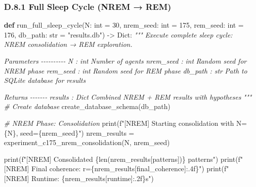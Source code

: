 \documentclass[
]{article}
\newenvironment{Shaded}{}{}
\newcommand{\BuiltInTok}[1]{\textcolor[rgb]{0.00,0.50,0.00}{#1}}
\newcommand{\CommentTok}[1]{\textcolor[rgb]{0.38,0.63,0.69}{\textit{#1}}}
\newcommand{\DecValTok}[1]{\textcolor[rgb]{0.25,0.63,0.44}{#1}}
\newcommand{\KeywordTok}[1]{\textcolor[rgb]{0.00,0.44,0.13}{\textbf{#1}}}
\newcommand{\NormalTok}[1]{#1}
\newcommand{\OperatorTok}[1]{\textcolor[rgb]{0.40,0.40,0.40}{#1}}
\newcommand{\SpecialCharTok}[1]{\textcolor[rgb]{0.25,0.44,0.63}{#1}}
\newcommand{\SpecialStringTok}[1]{\textcolor[rgb]{0.73,0.40,0.53}{#1}}
\newcommand{\StringTok}[1]{\textcolor[rgb]{0.25,0.44,0.63}{#1}}
\begin{document}
\subsubsection{D.8.1 Full Sleep Cycle (NREM →
REM)}\label{d.8.1-full-sleep-cycle-nrem-rem}

\begin{Shaded}
\begin{Highlighting}[]
\KeywordTok{def}\NormalTok{ run\_full\_sleep\_cycle(N: }\BuiltInTok{int} \OperatorTok{=} \DecValTok{30}\NormalTok{,}
\NormalTok{                        nrem\_seed: }\BuiltInTok{int} \OperatorTok{=} \DecValTok{175}\NormalTok{,}
\NormalTok{                        rem\_seed: }\BuiltInTok{int} \OperatorTok{=} \DecValTok{176}\NormalTok{,}
\NormalTok{                        db\_path: }\BuiltInTok{str} \OperatorTok{=} \StringTok{"results.db"}\NormalTok{) }\OperatorTok{{-}\textgreater{}}\NormalTok{ Dict:}
    \CommentTok{"""}
\CommentTok{    Execute complete sleep cycle: NREM consolidation → REM exploration.}

\CommentTok{    Parameters}
\CommentTok{    {-}{-}{-}{-}{-}{-}{-}{-}{-}{-}}
\CommentTok{    N : int}
\CommentTok{        Number of agents}
\CommentTok{    nrem\_seed : int}
\CommentTok{        Random seed for NREM phase}
\CommentTok{    rem\_seed : int}
\CommentTok{        Random seed for REM phase}
\CommentTok{    db\_path : str}
\CommentTok{        Path to SQLite database for results}

\CommentTok{    Returns}
\CommentTok{    {-}{-}{-}{-}{-}{-}{-}}
\CommentTok{    results : Dict}
\CommentTok{        Combined NREM + REM results with hypotheses}
\CommentTok{    """}
    \CommentTok{\# Create database}
\NormalTok{    create\_database\_schema(db\_path)}

    \CommentTok{\# NREM Phase: Consolidation}
    \BuiltInTok{print}\NormalTok{(}\SpecialStringTok{f"[NREM] Starting consolidation with N=}\SpecialCharTok{\{}\NormalTok{N}\SpecialCharTok{\}}\SpecialStringTok{, seed=}\SpecialCharTok{\{}\NormalTok{nrem\_seed}\SpecialCharTok{\}}\SpecialStringTok{"}\NormalTok{)}
\NormalTok{    nrem\_results }\OperatorTok{=}\NormalTok{ experiment\_c175\_nrem\_consolidation(N, nrem\_seed)}

    \BuiltInTok{print}\NormalTok{(}\SpecialStringTok{f"[NREM] Consolidated }\SpecialCharTok{\{}\BuiltInTok{len}\NormalTok{(nrem\_results[}\StringTok{\textquotesingle{}patterns\textquotesingle{}}\NormalTok{])}\SpecialCharTok{\}}\SpecialStringTok{ patterns"}\NormalTok{)}
    \BuiltInTok{print}\NormalTok{(}\SpecialStringTok{f"[NREM] Final coherence: r=}\SpecialCharTok{\{}\NormalTok{nrem\_results[}\StringTok{\textquotesingle{}final\_coherence\textquotesingle{}}\NormalTok{]}\SpecialCharTok{:.4f\}}\SpecialStringTok{"}\NormalTok{)}
    \BuiltInTok{print}\NormalTok{(}\SpecialStringTok{f"[NREM] Runtime: }\SpecialCharTok{\{}\NormalTok{nrem\_results[}\StringTok{\textquotesingle{}runtime\textquotesingle{}}\NormalTok{]}\SpecialCharTok{:.2f\}}\SpecialStringTok{s"}\NormalTok{)}


\end{Highlighting}
\end{Shaded}
\end{document}
